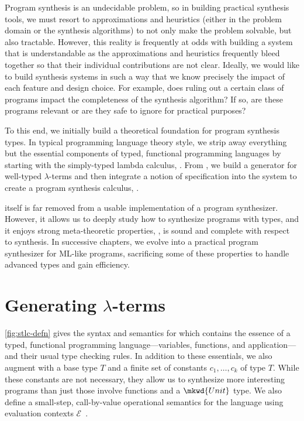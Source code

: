 Program synthesis is an undecidable problem, so in building practical synthesis tools, we must resort to approximations and heuristics (either in the problem domain or the synthesis algorithms) to not only make the problem solvable, but also tractable.
However, this reality is frequently at odds with building a system that is understandable as the approximations and heuristics frequently bleed together so that their individual contributions are not clear.
Ideally, we would like to build synthesis systems in such a way that we know precisely the impact of each feature and design choice.
For example, does ruling out a certain class of programs impact the completeness of the synthesis algorithm?
If so, are these programs relevant or are they safe to ignore for practical purposes?

To this end, we initially build a theoretical foundation for program synthesis types.
In typical programming language theory style, we strip away everything but the essential components of typed, functional programming languages by starting with the simply-typed lambda calculus, \stlc{}.
From \stlc{}, we build a generator for well-typed $λ$-terms and then integrate a notion of specification into the system to create a program synthesis calculus, \lsyn{}.

\lsyn{} itself is far removed from a usable implementation of a program synthesizer.
However, it allows us to deeply study how to synthesize programs with types, and it enjoys strong meta-theoretic properties, \ie, \lsyn{} is sound and complete with respect to synthesis.
In successive chapters, we evolve \lsyn{} into a practical program synthesizer for ML-like programs, sacrificing some of these properties to handle advanced types and gain efficiency.



\section{Generating \texorpdfstring{$λ$}{λ}-terms}

\autoref{fig:stlc-defn} gives the syntax and semantics for \stlc{} which contains the essence of a typed, functional programming language---variables, functions, and application---and their usual type checking rules.
In addition to these essentials, we also augment \stlc{} with a base type $T$ and a finite set of constants $c_1, …, c_k$ of type $T$.
While these constants are not necessary, they allow us to synthesize more interesting programs than just those involve functions and a $\mkwd{Unit}$ type.
We also define a small-step, call-by-value operational semantics for the language using evaluation contexts $ℰ$~.

